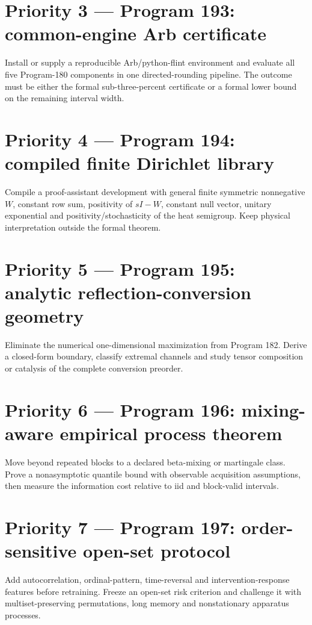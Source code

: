 \documentclass[11pt,a4paper,openany]{report}
\begin{document}
\section{Priority 3 --- Program 193: common-engine Arb certificate}

Install or supply a reproducible Arb/\allowbreak{}python-flint environment and evaluate all five Program-180 components in one directed-rounding pipeline. The outcome must be either the formal sub-three-percent certificate or a formal lower bound on the remaining interval width.

\section{Priority 4 --- Program 194: compiled finite Dirichlet library}

Compile a proof-assistant development with general finite symmetric nonnegative \(W\), constant row sum, positivity of \(sI-W\), constant null vector, unitary exponential and positivity/\allowbreak{}stochasticity of the heat semigroup. Keep physical interpretation outside the formal theorem.

\section{Priority 5 --- Program 195: analytic reflection-conversion geometry}

Eliminate the numerical one-dimensional maximization from Program 182. Derive a closed-form boundary, classify extremal channels and study tensor composition or catalysis of the complete conversion preorder.

\section{Priority 6 --- Program 196: mixing-aware empirical process theorem}

Move beyond repeated blocks to a declared beta-mixing or martingale class. Prove a nonasymptotic quantile bound with observable acquisition assumptions, then measure the information cost relative to iid and block-valid intervals.

\section{Priority 7 --- Program 197: order-sensitive open-set protocol}

Add autocorrelation, ordinal-pattern, time-reversal and intervention-response features before retraining. Freeze an open-set risk criterion and challenge it with multiset-preserving permutations, long memory and nonstationary apparatus processes.
\end{document}
